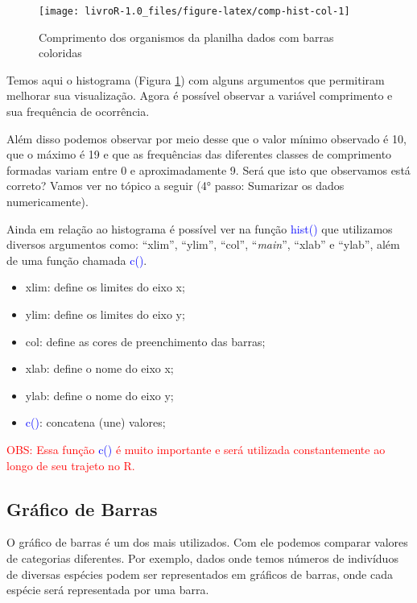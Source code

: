 \documentclass[14pt,titlepage, oneside, openany, a4paper]{book}
\providecommand{\tightlist}{%
  \setlength{\itemsep}{0pt}\setlength{\parskip}{0pt}}
\begin{document}
\begin{figure}[H]

{\centering \texttt{[image: livroR-1.0\_files/figure-latex/comp-hist-col-1]} 

}

\caption{Comprimento dos organismos da planilha dados com barras coloridas}\label{fig:comp-hist-col}
\end{figure}

Temos aqui o histograma (Figura \ref{fig:comp-hist-col}) com alguns argumentos que permitiram melhorar sua visualização. Agora é possível observar a variável comprimento e sua frequência de ocorrência.

Além disso podemos observar por meio desse que o valor mínimo observado é 10, que o máximo é 19 e que as frequências das diferentes classes de comprimento formadas variam entre 0 e aproximadamente 9. Será que isto que observamos está correto? Vamos ver no tópico a seguir (4° passo: Sumarizar os dados numericamente).

Ainda em relação ao histograma é possível ver na função \textcolor{blue}{hist()} que utilizamos diversos argumentos como: ``xlim'', ``ylim'', ``col'', ``\emph{main}'', ``xlab'' e ``ylab'', além de uma função chamada \textcolor{blue}{c()}.

\begin{itemize}
\tightlist
\item
  xlim: define os limites do eixo x;
\item
  ylim: define os limites do eixo y;
\item
  col: define as cores de preenchimento das barras;
\item
  xlab: define o nome do eixo x;
\item
  ylab: define o nome do eixo y;
\item
  \textcolor{blue}{c()}: concatena (une) valores;
\end{itemize}

\textcolor{red}{OBS: Essa função} \textcolor{blue}{c()} \textcolor{red}{é muito importante e será utilizada constantemente ao longo de seu trajeto no R.}

\hypertarget{gruxe1fico-de-barras}{%
\subsection{Gráfico de Barras}\label{gruxe1fico-de-barras}}

O gráfico de barras é um dos mais utilizados. Com ele podemos comparar valores de categorias diferentes. Por exemplo, dados onde temos números de indivíduos de diversas espécies podem ser representados em gráficos de barras, onde cada espécie será representada por uma barra.
\end{document}
